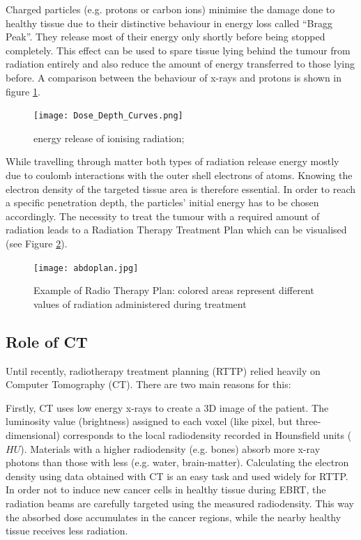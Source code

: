 Charged particles (e.g. protons or carbon ions) minimise the damage done to healthy tissue due to their distinctive behaviour in energy loss called ``Bragg Peak''.
They release most of their energy only shortly before being stopped completely.
\cite{Nakamura2010} This effect can be used to spare tissue lying behind the tumour from radiation entirely and also reduce the amount of energy transferred to those lying before. \cite{Paganetti2005}
A comparison between the behaviour of x-rays and protons is shown in figure \ref{fig:bragg}.

\begin{figure}[!h]
	\centering
	\texttt{[image: Dose\_Depth\_Curves.png]}
	\caption{energy release of ionising radiation; \cite{Cepheiden}}
	\label{fig:bragg}
\end{figure}

While travelling through matter both types of radiation release energy mostly due to coulomb interactions with the outer shell electrons of atoms.
Knowing the electron density of the targeted tissue area is therefore essential.
In order to reach a specific penetration depth, the particles' initial energy has to be chosen accordingly.
The necessity to treat the tumour with a required amount of radiation leads to a Radiation Therapy Treatment Plan which can be visualised (see Figure \ref{fig:plan}).

\begin{figure}[!tbh]
	\centering
	\texttt{[image: abdoplan.jpg]}
	\caption{Example of Radio Therapy Plan: colored areas represent different values of radiation administered during treatment }
	\label{fig:plan}
\end{figure}


\clearpage
\subsection{Role of CT}
Until recently, radiotherapy treatment planning (RTTP) relied heavily on Computer Tomography (CT).
There are two main reasons for this:

Firstly, CT uses low energy x-rays to create a 3D image of the patient.
The luminosity value (brightness) assigned to each voxel (like pixel, but three-dimensional) corresponds to the local radiodensity recorded in Hounsfield units ($HU$).
Materials with a higher radiodensity (e.g. bones) absorb more x-ray photons than those with less (e.g. water, brain-matter).
Calculating the electron density using data obtained with CT is an easy task and used widely for RTTP. \cite{Constantinou2012, Schneider1996}
In order not to induce new cancer cells in healthy tissue during EBRT, the radiation beams are carefully targeted using the measured radiodensity. 
This way the absorbed dose accumulates in the cancer regions, while the nearby healthy tissue receives less radiation.

